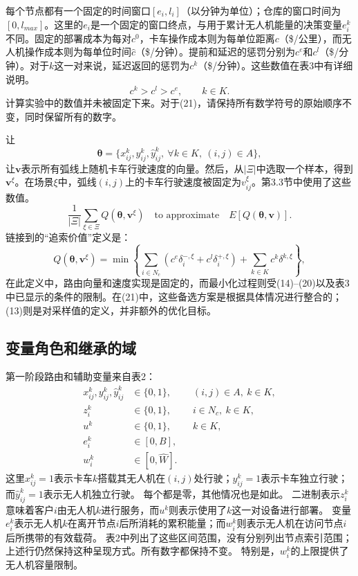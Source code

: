 \documentclass[10pt]{article}
\begin{document}
每个节点都有一个固定的时间窗口$[e_i,l_i]$（以分钟为单位）；仓库的窗口时间为$[0,l_{max}]$。这里的$e_i$是一个固定的窗口终点，与用于累计无人机能量的决策变量$e_i^k$不同。固定的部署成本为每对$c^0$，卡车操作成本则为每单位距离$c$（\$/公里），而无人机操作成本则为每单位时间$\hat c$（\$/分钟）。提前和延迟的惩罚分别为$c^e$和$c^l$（\$/分钟）。对于$k$这一对来说，延迟返回的惩罚为$c^k$（\$/分钟）。这些数值在表3中有详细说明。
\[
c^k>c^l>c^e,\qquad k\in K.
\]
计算实验中的数值并未被固定下来。对于(21)，请保持所有数学符号的原始顺序不变，同时保留所有的数字。

让
\[
\boldsymbol\theta=\{x_{ij}^k,y_{ij}^k,\hat y_{ij}^k,\ \forall k\in K,\ (i,j)\in A\},
\]
让$\mathbf v$表示所有弧线上随机卡车行驶速度的向量。然后，从$|\Xi|$中选取一个样本，得到$\mathbf v^\xi$。在场景$\xi$中，弧线$(i,j)$上的卡车行驶速度被固定为$v_{ij}^\xi$。第3.3节中使用了这些数值。
\[
\frac{1}{|\Xi|}\sum_{\xi\in\Xi}Q(\boldsymbol\theta,\mathbf v^\xi)
\quad\text{to approximate}\quad E[Q(\boldsymbol\theta,\mathbf v)].
\]
链接到的“追索价值”定义是：
\begin{equation}
Q(\boldsymbol\theta,\mathbf v^\xi)
=\min\left\{\sum_{i\in N_c}(c^e\delta_i^{-,\xi}+c^l\delta_i^{+,\xi})+\sum_{k\in K}c^k\delta^{k,\xi}\right\},\tag{13}
\end{equation}
在此定义中，路由向量和速度实现是固定的，而最小化过程则受(14)--(20)以及表3中已显示的条件的限制。在(21)中，这些备选方案是根据具体情况进行整合的；(13)则是对采样值的定义，并非额外的优化目标。

\subsection*{变量角色和继承的域}
第一阶段路由和辅助变量来自表2：
\[
\begin{aligned}
x_{ij}^k,y_{ij}^k,\hat y_{ij}^k&\in\{0,1\},&& (i,j)\in A,\ k\in K,\\
z_i^k&\in\{0,1\},&& i\in N_c,\ k\in K,\\
u^k&\in\{0,1\},&& k\in K,\\
e_i^k&\in[0,B],\\
w_i^k&\in[0,\hat W].
\end{aligned}
\]
这里$x_{ij}^k=1$表示卡车$k$搭载其无人机在$(i,j)$处行驶；$y_{ij}^k=1$表示卡车独立行驶；而$\hat y_{ij}^k=1$表示无人机独立行驶。 每个都是零，其他情况也是如此。 二进制表示$z_i^k$意味着客户$i$由无人机$k$进行服务，而$u^k$则表示使用了$k$这一对设备进行部署。 变量$e_i^k$表示无人机$k$在离开节点$i$后所消耗的累积能量；而$w_i^k$则表示无人机在访问节点$i$后所携带的有效载荷。 表2中列出了这些区间范围，没有分别列出节点索引范围；上述行仍然保持这种呈现方式。所有数字都保持不变。 特别是，$w_i^k$的上限提供了无人机容量限制。
\end{document}
